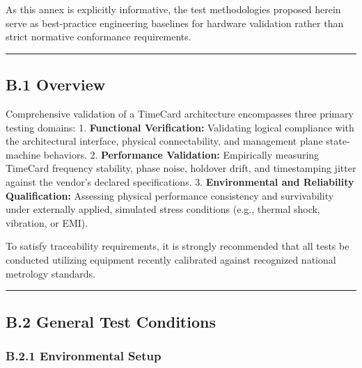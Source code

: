 As this annex is explicitly informative, the test methodologies proposed
herein serve as best-practice engineering baselines for hardware
validation rather than strict normative conformance requirements.

\begin{center}\rule{0.5\linewidth}{0.5pt}\end{center}

\subsection{B.1 Overview}\label{b.1-overview}

Comprehensive validation of a TimeCard architecture encompasses three
primary testing domains: 1. \textbf{Functional Verification:} Validating
logical compliance with the architectural interface, physical
connectability, and management plane state-machine behaviors. 2.
\textbf{Performance Validation:} Empirically measuring TimeCard
frequency stability, phase noise, holdover drift, and timestamping
jitter against the vendor's declared specifications. 3.
\textbf{Environmental and Reliability Qualification:} Assessing physical
performance consistency and survivability under externally applied,
simulated stress conditions (e.g., thermal shock, vibration, or EMI).

To satisfy traceability requirements, it is strongly recommended that
all tests be conducted utilizing equipment recently calibrated against
recognized national metrology standards.

\begin{center}\rule{0.5\linewidth}{0.5pt}\end{center}

\subsection{B.2 General Test
Conditions}\label{b.2-general-test-conditions}

\subsubsection{B.2.1 Environmental
Setup}\label{b.2.1-environmental-setup}

